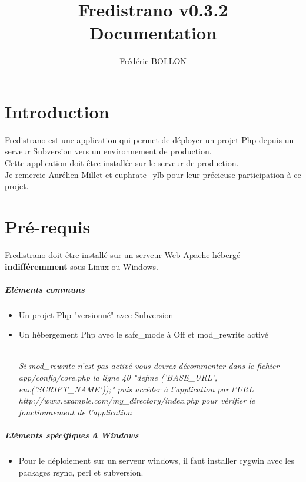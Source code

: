 \documentclass[12pt,a4paper]{report}
\author{Frédéric BOLLON}
\title{Fredistrano v0.3.2\\Documentation\\}
\begin{document}
\maketitle
\tableofcontents

\chapter{Introduction}
Fredistrano est une application qui permet de déployer un projet Php depuis un serveur Subversion vers un environnement de production.\\
Cette application doit \^{e}tre installée sur le serveur de production.\\

Je remercie Aurélien Millet et euphrate\_ylb pour leur précieuse participation à ce projet.

\chapter{Pré-requis}

Fredistrano doit \^{e}tre installé sur un serveur Web Apache hébergé \textbf{indifféremment} sous Linux ou Windows. 

\paragraph*{Eléments communs}
\begin{itemize}
\item
Un projet Php "versionné" avec Subversion
\item 
Un hébergement Php avec le safe\_mode à Off et mod\_rewrite activé	\\\\
\begin{small}\textit{Si mod\_rewrite n'est pas activé vous devrez décommenter dans le fichier app/config/core.php la ligne 40 "define ('BASE\_URL', env('SCRIPT\_NAME'));" puis accéder à l'application par l'URL\\ http://www.example.com/my\_directory/index.php pour vérifier le fonctionnement de l'application}\end{small}
\end{itemize}

\paragraph*{Eléments spécifiques à Windows}
\begin{itemize}
\item
Pour le déploiement sur un serveur windows, il faut installer cygwin avec les packages rsync, perl et subversion.

\end{itemize}
\end{document}
